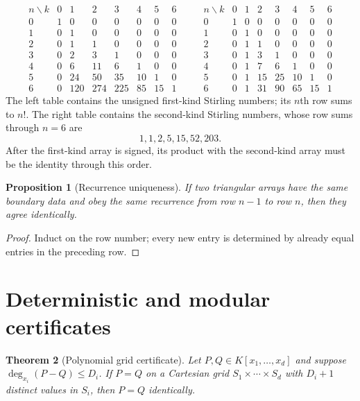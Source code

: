\documentclass[11pt,a4paper,oneside,openany]{book}
\newtheorem{theorem}{Theorem}[chapter]
\newtheorem{proposition}[theorem]{Proposition}
\theoremstyle{definition}
\theoremstyle{remark}
\begin{document}
\[
\begin{array}{c|rrrrrrr}
 n\backslash k&0&1&2&3&4&5&6\\ \hline
0&1&0&0&0&0&0&0\\1&0&1&0&0&0&0&0\\2&0&1&1&0&0&0&0\\
3&0&2&3&1&0&0&0\\4&0&6&11&6&1&0&0\\5&0&24&50&35&10&1&0\\
6&0&120&274&225&85&15&1
\end{array}
\qquad
\begin{array}{c|rrrrrrr}
 n\backslash k&0&1&2&3&4&5&6\\ \hline
0&1&0&0&0&0&0&0\\1&0&1&0&0&0&0&0\\2&0&1&1&0&0&0&0\\
3&0&1&3&1&0&0&0\\4&0&1&7&6&1&0&0\\5&0&1&15&25&10&1&0\\
6&0&1&31&90&65&15&1
\end{array}                                                               \tag{\(*\)}
\]
The left table contains the unsigned first-kind Stirling numbers; its
$n$th row sums to $n!$.  The right table contains the second-kind Stirling
numbers, whose row sums through $n=6$ are
\[
 1,1,2,5,15,52,203.
\]
After the first-kind array is signed, its product with the second-kind array
must be the identity through this order.

\begin{proposition}[Recurrence uniqueness]
If two triangular arrays have the same boundary data and obey the same
recurrence from row $n-1$ to row $n$, then they agree identically.
\end{proposition}

\begin{proof}
Induct on the row number; every new entry is determined by already equal
entries in the preceding row.
\end{proof}

\section{Deterministic and modular certificates}

\begin{theorem}[Polynomial grid certificate]
\label{thm:merged-grid-certificate}
Let $P,Q\in K[x_1,\ldots,x_d]$ and suppose
$\deg_{x_i}(P-Q)\leq D_i$.  If $P=Q$ on a Cartesian grid
$S_1\times\cdots\times S_d$ with $D_i+1$ distinct values in $S_i$, then
$P=Q$ identically.
\end{theorem}
\end{document}

